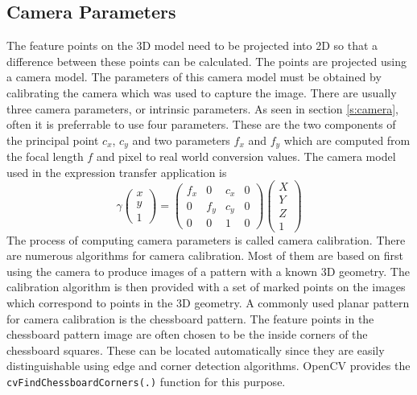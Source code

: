 \documentclass[11pt,a4paper]{report}
\begin{document}
\subsection{Camera Parameters}
The feature points on the 3D model need to be projected into 2D so that a
difference between these points can be calculated. The points are projected
using a camera model. The parameters of this camera model must be obtained by calibrating the camera which
was used to capture the image. There are usually three camera parameters, or intrinsic
parameters. As seen in section \ref{s:camera}, often it is preferrable to use
four parameters. These are the two components of the principal point $c_x$,
$c_y$ and two parameters $f_x$ and $f_y$ which are computed from the focal
length $f$ and pixel to real world conversion values. The camera model used in
the expression transfer application is
\begin{equation}\label{eq:projective}
\gamma\begin{pmatrix}x\\y\\1\end{pmatrix}
= \begin{pmatrix}f_x&0&c_x&0\\0&f_y&c_y&0\\0&0&1&0\end{pmatrix} \begin{pmatrix}X\\Y\\Z\\1\end{pmatrix}
\end{equation}
The process of computing camera parameters is called camera calibration. There
are numerous algorithms for camera calibration. Most of them are based on first
using the camera to produce images of a pattern with a known 3D geometry. The calibration algorithm is then
provided with a set of marked points on the images which correspond to points in
the 3D geometry. A commonly used planar pattern for camera calibration is
the chessboard pattern. The feature points in the chessboard pattern image are
often chosen to be the inside corners of the chessboard squares. These can
be located automatically since they are easily distinguishable using edge and
corner detection algorithms. OpenCV provides the
\texttt{cvFindChessboardCorners(.)} function for this purpose.
\end{document}
